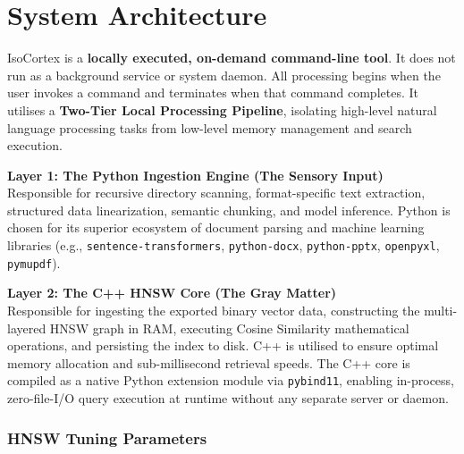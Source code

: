 \documentclass[12pt, a4paper]{article}
\begin{document}
\section{System Architecture}

IsoCortex is a \textbf{locally executed, on-demand command-line tool}. It
does not run as a background service or system daemon. All processing
begins when the user invokes a command and terminates when that command
completes. It utilises a \textbf{Two-Tier Local Processing Pipeline},
isolating high-level natural language processing tasks from low-level
memory management and search execution.

\begin{tcolorbox}[standardbox, colback=ctLightGold, colframe=ctGold]
    \textbf{\textcolor{ctPurple}{Layer 1: The Python Ingestion Engine
    (The Sensory Input)}} \\[4pt]
    Responsible for recursive directory scanning, format-specific text
    extraction, structured data linearization, semantic chunking, and model
    inference. Python is chosen for its superior ecosystem of document
    parsing and machine learning libraries (e.g.,
    \texttt{sentence-transformers}, \texttt{python-docx},
    \texttt{python-pptx}, \texttt{openpyxl}, \texttt{pymupdf}).
\end{tcolorbox}

\vspace{0.3cm}

\begin{tcolorbox}[standardbox, colback=ctLightPurple, colframe=ctPurple]
    \textbf{\textcolor{ctGold}{Layer 2: The C++ HNSW Core
    (The Gray Matter)}} \\[4pt]
    Responsible for ingesting the exported binary vector data, constructing
    the multi-layered HNSW graph in RAM, executing Cosine Similarity
    mathematical operations, and persisting the index to disk. C++ is
    utilised to ensure optimal memory allocation and sub-millisecond
    retrieval speeds. The C++ core is compiled as a native Python extension
    module via \texttt{pybind11}, enabling in-process, zero-file-I/O query
    execution at runtime without any separate server or daemon.
\end{tcolorbox}

\vspace{0.5cm}
\subsubsection*{\textsf{\textcolor{ctPurple}{HNSW Tuning Parameters}}}
\vspace{0.2cm}
\end{document}

